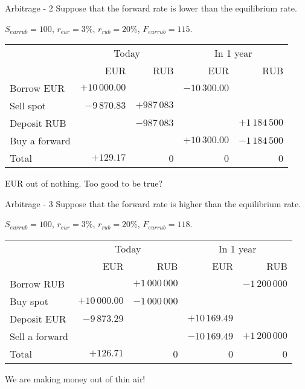 \documentclass{beamer}
\begin{document}
\begin{frame}{Arbitrage - 2}
\justify
Suppose that the forward rate is lower than the equilibrium rate.

$S_{eurrub}=100$, $r_{eur}=3\%$, $r_{rub}=20\%$, $F_{eurrub}=115$. 

\justify
\centering
\small{
\begin{tabular}{l|r|r|r|r}
& \multicolumn{2}{c|}{Today} & \multicolumn{2}{c}{In 1 year} \\ \cline{2-5}
& EUR & RUB & EUR & RUB \\ \hline
Borrow EUR     & $+10\,000.00$ &                                   & $-10\,300.00$ & \\
Sell spot            & $-9\,870.83$ & $+987\,083$ &                               & \\
Deposit RUB    &                                & $-987\,083$  &                                & $+1\,184\,500$ \\
Buy a forward &                               &                                 & $+10\,300.00$ & $-1\,184\,500$ \\ \hline
Total & $+129.17$ & 0 & 0 & 0
\end{tabular}
}

 EUR out of nothing. Too good to be true?
\end{frame}



\begin{frame}{Arbitrage -  3}
\justify
Suppose that the forward rate is higher than the equilibrium rate.

 $S_{eurrub}=100$, $r_{eur}=3\%$, $r_{rub}=20\%$, $F_{eurrub}=118$. 

\justify
\centering
\small{
\begin{tabular}{l|r|r|r|r}
& \multicolumn{2}{c|}{Today} & \multicolumn{2}{c}{In 1 year} \\ \cline{2-5}
& EUR & RUB & EUR & RUB \\ \hline
Borrow RUB     &                               & $+1\,000\,000$  &                            & $-1\,200\,000$  \\
Buy spot            & $+10\,000.00$ & $-1\,000\,000$ &                               &   \\
Deposit EUR    &  $-9\,873.29$  &                                 & $+10\,169.49$ &  \\
Sell a forward &                               &                                & $-10\,169.49$ & $+1\,200\,000$ \\ \hline
Total & $+126.71$ & 0 & 0 & 0
\end{tabular}
}

\justify
We are making money out of thin air!
\end{frame}
\end{document}
